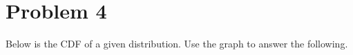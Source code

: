 \documentclass[12pt,twoside]{article}
\newcommand{\?}{\stackrel{?}{=}}
\begin{document}

  








 

 \section*{Problem 4 }
   Below is the CDF of a given  distribution. Use the graph to answer the following.
\end{document}
